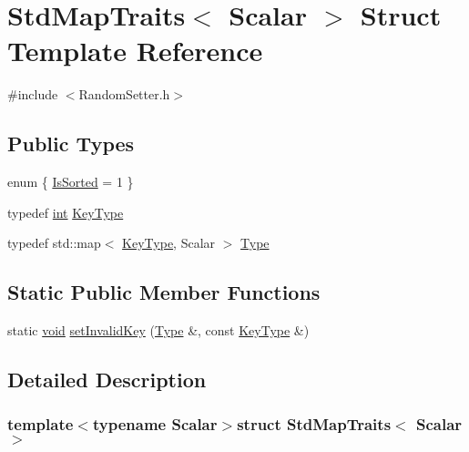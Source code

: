 \hypertarget{struct_std_map_traits}{\section{Std\-Map\-Traits$<$ Scalar $>$ Struct Template Reference}
\label{struct_std_map_traits}
}


{\ttfamily \#include $<$Random\-Setter.\-h$>$}

\subsection*{Public Types}
\begin{DoxyCompactItemize}
\item 
enum \{ \hyperlink{struct_std_map_traits_a684bbba7e84cb533fefc00ba089043eda032858dcdf550ba8c195b378742d5a6a}{Is\-Sorted} = 1
 \}
\item 
typedef \hyperlink{ioapi_8h_a787fa3cf048117ba7123753c1e74fcd6}{int} \hyperlink{struct_std_map_traits_aaf2a41e0ac3e1a466f0c7a398b47f93b}{Key\-Type}
\item 
typedef std\-::map$<$ \hyperlink{struct_std_map_traits_aaf2a41e0ac3e1a466f0c7a398b47f93b}{Key\-Type}, Scalar $>$ \hyperlink{struct_std_map_traits_ab952e2bbbde3f9c01b1e07f1eb30f661}{Type}
\end{DoxyCompactItemize}
\subsection*{Static Public Member Functions}
\begin{DoxyCompactItemize}
\item 
static \hyperlink{group___u_a_v_objects_plugin_ga444cf2ff3f0ecbe028adce838d373f5c}{void} \hyperlink{struct_std_map_traits_ab1df277c58b33000880c9f7ac7b98635}{set\-Invalid\-Key} (\hyperlink{struct_std_map_traits_ab952e2bbbde3f9c01b1e07f1eb30f661}{Type} \&, const \hyperlink{struct_std_map_traits_aaf2a41e0ac3e1a466f0c7a398b47f93b}{Key\-Type} \&)
\end{DoxyCompactItemize}


\subsection{Detailed Description}
\subsubsection*{template$<$typename Scalar$>$struct Std\-Map\-Traits$<$ Scalar $>$}

